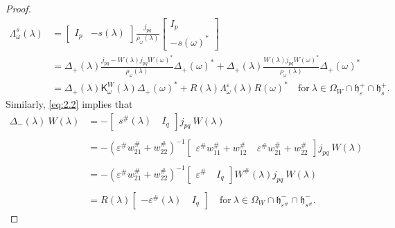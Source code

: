 \documentclass[12pt,twoside,a4paper]{amsart}
\theoremstyle{definition}
\numberwithin{equation}{section}
\begin{document}
\begin{proof}
\begin{equation}
    \begin{split}
      {\mathsf \Lambda} ^s_\omega({\lambda})&= \begin{bmatrix}I_{p} &
-s({\lambda})\end{bmatrix} \frac{j_{pq}}{\rho_\omega({\lambda})}
    \begin{bmatrix}I_p\\
      -s(\omega)^*
    \end{bmatrix}\\
       & = \Delta_+({\lambda})\frac{j_{pq}-W({\lambda})j_{pq}W(\omega)^*}
       {\rho_\omega({\lambda})} \Delta_+(\omega)^*+
       \Delta_+({\lambda})\frac{W({\lambda})j_{pq}W(\omega)^*}
       {\rho_\omega({\lambda})}\Delta_+(\omega)^*\\
       &=\Delta_+({\lambda}){\mathsf K}^W_\omega({\lambda})\Delta_+(\omega)^*+R({\lambda}){\mathsf \Lambda}^\varepsilon_\omega({\lambda})R({\omega})^*\quad\text{for}\
{\lambda} \in \Omega_W\cap{{\mathfrak h}}_\varepsilon^+\cap{\mathfrak h}_s^+.
    \end{split}
\end{equation}
Similarly, \eqref{eq:2.2} implies that
\begin{equation}\label{eq:2.17}
    \begin{array}{ll}
      \Delta_-({\lambda})\ W({\lambda}) &= -\begin{bmatrix}s^\#({\lambda})&\ I_q\end{bmatrix}
      j_{pq}\ W({\lambda}) \\
      \\
       & =-(\varepsilon^\# w^\#_{21}+w^\#_{22})^{-1}
    \begin{bmatrix}\varepsilon^\# w^\#_{11}+w^\#_{12} &\ \varepsilon^\# w^\#_{21}+w^\#_{22}\end{bmatrix}
       j_{pq}\ W({\lambda})\\
       \\
      & = -(\varepsilon^\# w^\#_{21}+w^\#_{22})^{-1}
      \begin{bmatrix}\varepsilon^\# &\ I_q\end{bmatrix}
      W^\#({\lambda})
     j_{pq}\ W({\lambda})\\
     \\
      & =R({\lambda})\begin{bmatrix}-\varepsilon^\#({\lambda})&\ I_q
\end{bmatrix}\quad\text{for}\ {\lambda}\in \Omega_W\cap {{\mathfrak h}}_{\varepsilon^\#}^-\cap
{\mathfrak h}_{s^{\#}}^-.
         \end{array}

\end{equation}
\end{proof}
\end{document}
